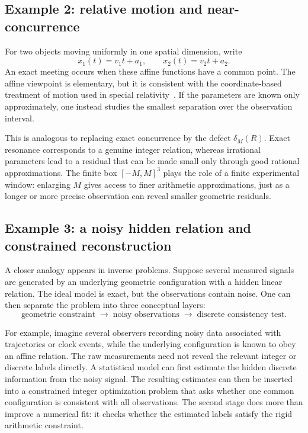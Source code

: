 \documentclass[11pt,a4paper]{article}
\begin{document}
\subsection{Example 2: relative motion and near-concurrence}
For two objects moving uniformly in one spatial dimension, write
\[
x_1(t)=v_1t+a_1,\qquad x_2(t)=v_2t+a_2.
\]
An exact meeting occurs when these affine functions have a common point. The affine viewpoint is elementary, but it is consistent with the coordinate-based treatment of motion used in special relativity~\cite{einstein1905,schutz2009}. If the parameters are known
only approximately, one instead studies the smallest separation over the observation interval.

This is analogous to replacing exact concurrence by the defect $\delta_M(R)$. Exact resonance corresponds
to a genuine integer relation, whereas irrational parameters lead to a residual that can be made small
only through good rational approximations. The finite box $[-M,M]^3$ plays the role of a finite experimental
window: enlarging $M$ gives access to finer arithmetic approximations, just as a longer or more precise
observation can reveal smaller geometric residuals.

\subsection{Example 3: a noisy hidden relation and constrained reconstruction}
A closer analogy appears in inverse problems. Suppose several measured signals are generated by
an underlying geometric configuration with a hidden linear relation. The ideal model is exact, but the
observations contain noise. One can then separate the problem into three conceptual layers:
\[
\text{geometric constraint}
\;\longrightarrow\;
\text{noisy observations}
\;\longrightarrow\;
\text{discrete consistency test}.
\]

For example, imagine several observers recording noisy data associated with trajectories or clock events,
while the underlying configuration is known to obey an affine relation. The raw measurements need not
reveal the relevant integer or discrete labels directly. A statistical model can first estimate the hidden
discrete information from the noisy signal. The resulting estimates can then be inserted into a constrained
integer optimization problem that asks whether one common configuration is consistent with all observations.
The second stage does more than improve a numerical fit: it checks whether the estimated labels satisfy the rigid arithmetic constraint.
\end{document}
